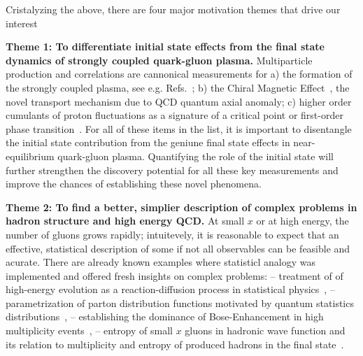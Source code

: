 
Cristalyzing %
the above, there are four  major motivation themes that drive our interest  

\vspace{0.5em}

\noindent
{\bf Theme 1: 
To differentiate initial state effects from the final state dynamics of strongly coupled quark-gluon plasma. 
}
Multiparticle production and correlations are cannonical measurements for a) the formation of the strongly coupled 
plasma, see e.g. Refs.~\cite{Schafer:2009dj,Song:2010mg}; b) the Chiral Magnetic Effect~\cite{Kharzeev:2007jp}, the novel transport mechanism due to QCD quantum axial anomaly;
c) higher order cumulants of proton fluctuations as a signature of a critical point or first-order phase transition~\cite{Stephanov:2008qz}. 
For all of these items in the list, it is important to disentangle the initial state contribution from 
the geniune final state effects in near-equilibrium quark-gluon plasma. Quantifying the role of the initial state 
will further strengthen the discovery potential for all these key measurements and improve the chances of 
establishing these novel phenomena.   

\vspace{0.5em}

\noindent
{\bf Theme 2: 
	To find  a better, simplier description of complex problems in hadron structure and 
high energy QCD. 
}	 
At small $x$ or at high energy, the number of gluons grows rapidly; intuitevely, it is  
reasonable to expect that an effective, statistical description of some if not all 
observables can be feasible and acurate. There are already known examples where 
statisticl analogy  was implemented and offered fresh insights on complex problems: 
-- treatment of of high-energy evolution as a reaction-diffusion process in statistical physics~\cite{Munier:2003vc,Iancu:2004es,Kutak:2011rb}, 
-- parametrization of parton distribution functions motivated by quantum statistics distributions~\cite{Mac:1989ki,Bhalerao:1996fc,Bourrely:2001du}, 
-- establishing the dominance of Bose-Enhancement in high multiplicity events~\cite{Kovner:2018azs}, 
-- entropy of small $x$ gluons in hadronic wave function and its relation to 
multiplicity and entropy of produced hadrons in the final state~\cite{Peschanski:2012cw,Kovner:2015hga,Kharzeev:2017qzs,Shuryak:2017phz,Hagiwara:2017uaz}.  


